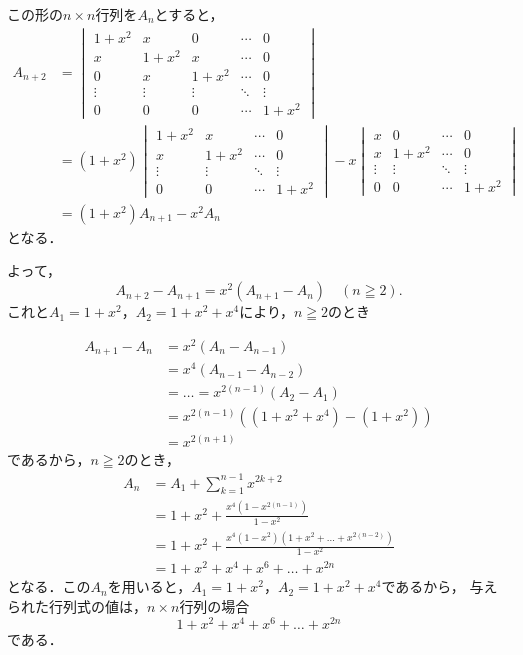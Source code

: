 \documentclass[a4paper,10pt,fleqn]{ltjsarticle}
\begin{document}
\begin{tleftbar}
  この形の$n\times n $行列を$A_n$とすると，
  \begin{align*}
    A_{n+2} & =
    \begin{vmatrix}
      1+x^2  & x      & 0      & \cdots & 0      \\
      x      & 1+x^2  & x      & \cdots & 0      \\
      0      & x      & 1+x^2  & \cdots & 0      \\
      \vdots & \vdots & \vdots & \ddots & \vdots \\
      0      & 0      & 0      & \cdots & 1+x^2
    \end{vmatrix} \\
            & = (1+x^2)
    \begin{vmatrix}
      1+x^2  & x      & \cdots & 0      \\
      x      & 1+x^2  & \cdots & 0      \\
      \vdots & \vdots & \ddots & \vdots \\
      0      & 0      & \cdots & 1+x^2
    \end{vmatrix}
    -x \begin{vmatrix}
         x      & 0      & \cdots & 0      \\
         x      & 1+x^2  & \cdots & 0      \\
         \vdots & \vdots & \ddots & \vdots \\
         0      & 0      & \cdots & 1+x^2
       \end{vmatrix}
    \\
            & = (1+x^2) A_{n+1} -x^2 A_n
  \end{align*}
  となる．

  よって，
  \[
    A_{n+2}-A_{n+1}=x^2 (A_{n+1}-A_n)\quad ( n \geqq 2) .
  \]
  これと$ A_1=1+x^2$，$ A_2 = 1+x^2 + x^4$により，$n \geqq 2$のとき

  \begin{align*}
    A_{n+1}-A_{n} & = x^2 (A_n-A_{n-1})                   \\
                  & = x^4 (A_{n-1} - A_{n-2})             \\
                  & = \dots = x^{2(n-1)}(A_2-A_1)         \\
                  & = x^{2(n-1)} ((1+x^2 + x^4) -(1+x^2)) \\
                  & = x^{2(n+1)}
  \end{align*}
  であるから，$n \geqq 2$のとき，
  \begin{align*}
    A_n & = A_1 +\sum_{k=1}^{n-1} x^{2k+2}                                \\
        & = 1+x^2 + \frac{x^4(1-x^{2(n-1)})}{1-x^2}                       \\
        & = 1+x^2 + \frac{x^4 (1-x^2)(1+x^2 + \dots + x^{2(n-2)})}{1-x^2} \\
        & = 1+x^2 + x^4 + x^6 + \dots + x^{2n}
  \end{align*}
  となる．この$ A_n$を用いると，$ A_1 = 1+x^2 $，$ A_2 = 1+x^2+x^4$であるから，
  与えられた行列式の値は，$n \times n$行列の場合
  \[
    1+x^2 + x^4 + x^6 + \dots + x^{2n}
  \]
  である．
\end{tleftbar}
\end{document}
